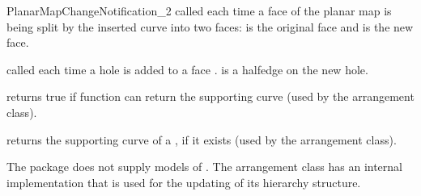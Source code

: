 \begin{ccRefConcept}{PlanarMapChangeNotification_2}
  {called each time a face of the planar map is being split by
  the inserted curve into two faces:  is the
  original face and  is the new face.
  }

  {called each time a hole is added to a face .
   is a halfedge on the new hole.
  }

  {returns true if  function can return the
  supporting curve (used by the arrangement class).
  }

  {returns the supporting curve of a , if it exists
  (used by the arrangement class).
  }

\ccHasModels

  The package does not supply models of
  . The
  arrangement class has an internal implementation that is used for
  the updating of its hierarchy structure.

\end{ccRefConcept}

\ccRefPageEnd
